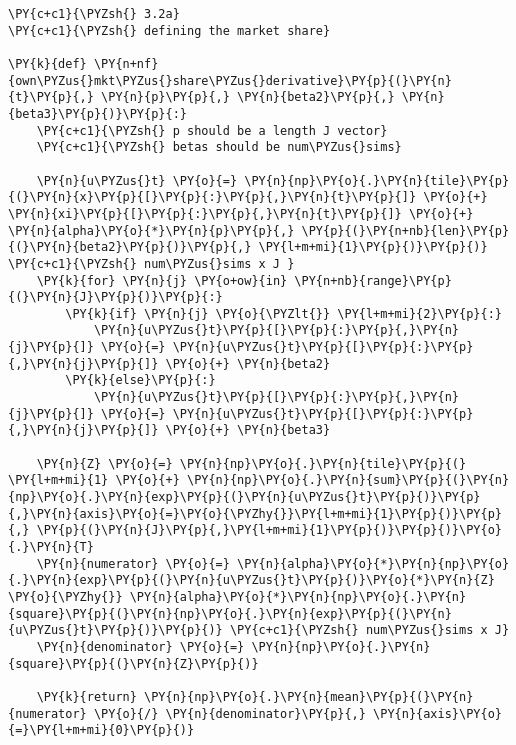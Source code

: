     \begin{tcolorbox}[breakable, size=fbox, boxrule=1pt, pad at break*=1mm,colback=cellbackground, colframe=cellborder]
\begin{Verbatim}[commandchars=\\\{\}]
\PY{c+c1}{\PYZsh{} 3.2a}
\PY{c+c1}{\PYZsh{} defining the market share}

\PY{k}{def} \PY{n+nf}{own\PYZus{}mkt\PYZus{}share\PYZus{}derivative}\PY{p}{(}\PY{n}{t}\PY{p}{,} \PY{n}{p}\PY{p}{,} \PY{n}{beta2}\PY{p}{,} \PY{n}{beta3}\PY{p}{)}\PY{p}{:}
    \PY{c+c1}{\PYZsh{} p should be a length J vector}
    \PY{c+c1}{\PYZsh{} betas should be num\PYZus{}sims}

    \PY{n}{u\PYZus{}t} \PY{o}{=} \PY{n}{np}\PY{o}{.}\PY{n}{tile}\PY{p}{(}\PY{n}{x}\PY{p}{[}\PY{p}{:}\PY{p}{,}\PY{n}{t}\PY{p}{]} \PY{o}{+} \PY{n}{xi}\PY{p}{[}\PY{p}{:}\PY{p}{,}\PY{n}{t}\PY{p}{]} \PY{o}{+} \PY{n}{alpha}\PY{o}{*}\PY{n}{p}\PY{p}{,} \PY{p}{(}\PY{n+nb}{len}\PY{p}{(}\PY{n}{beta2}\PY{p}{)}\PY{p}{,} \PY{l+m+mi}{1}\PY{p}{)}\PY{p}{)} \PY{c+c1}{\PYZsh{} num\PYZus{}sims x J }
    \PY{k}{for} \PY{n}{j} \PY{o+ow}{in} \PY{n+nb}{range}\PY{p}{(}\PY{n}{J}\PY{p}{)}\PY{p}{:}
        \PY{k}{if} \PY{n}{j} \PY{o}{\PYZlt{}} \PY{l+m+mi}{2}\PY{p}{:}
            \PY{n}{u\PYZus{}t}\PY{p}{[}\PY{p}{:}\PY{p}{,}\PY{n}{j}\PY{p}{]} \PY{o}{=} \PY{n}{u\PYZus{}t}\PY{p}{[}\PY{p}{:}\PY{p}{,}\PY{n}{j}\PY{p}{]} \PY{o}{+} \PY{n}{beta2}
        \PY{k}{else}\PY{p}{:}
            \PY{n}{u\PYZus{}t}\PY{p}{[}\PY{p}{:}\PY{p}{,}\PY{n}{j}\PY{p}{]} \PY{o}{=} \PY{n}{u\PYZus{}t}\PY{p}{[}\PY{p}{:}\PY{p}{,}\PY{n}{j}\PY{p}{]} \PY{o}{+} \PY{n}{beta3}

    \PY{n}{Z} \PY{o}{=} \PY{n}{np}\PY{o}{.}\PY{n}{tile}\PY{p}{(} \PY{l+m+mi}{1} \PY{o}{+} \PY{n}{np}\PY{o}{.}\PY{n}{sum}\PY{p}{(}\PY{n}{np}\PY{o}{.}\PY{n}{exp}\PY{p}{(}\PY{n}{u\PYZus{}t}\PY{p}{)}\PY{p}{,}\PY{n}{axis}\PY{o}{=}\PY{o}{\PYZhy{}}\PY{l+m+mi}{1}\PY{p}{)}\PY{p}{,} \PY{p}{(}\PY{n}{J}\PY{p}{,}\PY{l+m+mi}{1}\PY{p}{)}\PY{p}{)}\PY{o}{.}\PY{n}{T}
    \PY{n}{numerator} \PY{o}{=} \PY{n}{alpha}\PY{o}{*}\PY{n}{np}\PY{o}{.}\PY{n}{exp}\PY{p}{(}\PY{n}{u\PYZus{}t}\PY{p}{)}\PY{o}{*}\PY{n}{Z} \PY{o}{\PYZhy{}} \PY{n}{alpha}\PY{o}{*}\PY{n}{np}\PY{o}{.}\PY{n}{square}\PY{p}{(}\PY{n}{np}\PY{o}{.}\PY{n}{exp}\PY{p}{(}\PY{n}{u\PYZus{}t}\PY{p}{)}\PY{p}{)} \PY{c+c1}{\PYZsh{} num\PYZus{}sims x J}
    \PY{n}{denominator} \PY{o}{=} \PY{n}{np}\PY{o}{.}\PY{n}{square}\PY{p}{(}\PY{n}{Z}\PY{p}{)}

    \PY{k}{return} \PY{n}{np}\PY{o}{.}\PY{n}{mean}\PY{p}{(}\PY{n}{numerator} \PY{o}{/} \PY{n}{denominator}\PY{p}{,} \PY{n}{axis}\PY{o}{=}\PY{l+m+mi}{0}\PY{p}{)}


\end{Verbatim}
\end{tcolorbox}
